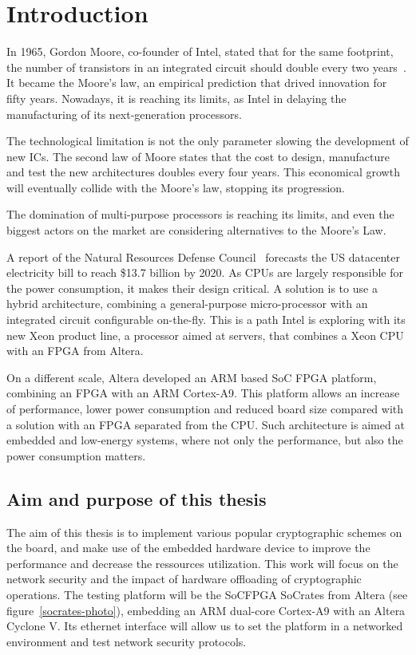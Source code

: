 \chapter{Introduction}
In 1965, Gordon Moore, co-founder of Intel, stated that for the same footprint, the number of transistors in an integrated circuit should double every two years~\cite{moore1965}.
It became the Moore's law, an empirical prediction that drived innovation for fifty years.
Nowadays, it is reaching its limits, as Intel in delaying the manufacturing of its next-generation processors.

The technological limitation is not the only parameter slowing the development of new ICs.
The second law of Moore states that the cost to design, manufacture and test the new architectures doubles every four years.
This economical growth will eventually collide with the Moore's law, stopping its progression.

The domination of multi-purpose processors is reaching its limits, and even the biggest actors on the market are considering alternatives to the Moore's Law.

\noindent A report of the Natural Resources Defense Council~\cite{nrdc2014} forecasts the US datacenter electricity bill to reach \$13.7 billion by 2020.
As CPUs are largely responsible for the power consumption, it makes their design critical.
A solution is to use a hybrid architecture, combining a general-purpose micro-processor with an integrated circuit configurable on-the-fly.
This is a path Intel is exploring with its new Xeon product line, a processor aimed at servers, that combines a Xeon CPU with an FPGA from Altera\cite{xeon2014}.\newline{}

On a different scale, Altera developed an ARM based SoC FPGA platform, combining an FPGA with an ARM Cortex-A9.
This platform allows an increase of performance, lower power consumption and reduced board size compared with a solution with an FPGA separated from the CPU.
Such architecture is aimed at embedded and low-energy systems, where not only the performance, but also the power consumption matters.







\section{Aim and purpose of this thesis}
The aim of this thesis is to implement various popular cryptographic schemes on the board, and make use of the embedded hardware device to improve the performance and decrease the ressources utilization.
This work will focus on the network security and the impact of hardware offloading of cryptographic operations.
The testing platform will be the SoCFPGA SoCrates from Altera (see figure~\ref{socrates-photo}), embedding an ARM dual-core Cortex-A9 with an Altera Cyclone V.
Its ethernet interface will allow us to set the platform in a networked environment and test network security protocols.


